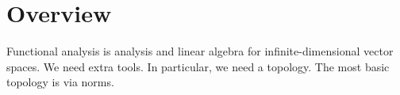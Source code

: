 

\section*{Overview}

Functional analysis is analysis and linear algebra for infinite-dimensional vector spaces.
We need extra tools.
In particular, we need a topology. The most basic topology is via norms.

\blankpage